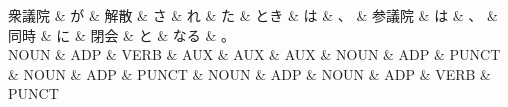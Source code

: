 \documentclass[tikz,border=5pt]{standalone}
\begin{document}
\normalsize
\begin{dependency}[edge unit distance=12.0pt]
    \begin{deptext}[column sep=1em]
        衆議院 \& が \& 解散 \& さ \& れ \& た \& とき \& は \& 、 \& 参議院 \& は \& 、 \& 同時 \& に \& 閉会 \& と \& なる \& 。\\
        NOUN \& ADP \& VERB \& AUX \& AUX \& AUX \& NOUN \& ADP \& PUNCT \& NOUN \& ADP \& PUNCT \& NOUN \& ADP \& NOUN \& ADP \& VERB \& PUNCT\\
    \end{deptext}
\end{dependency}
\end{document}
